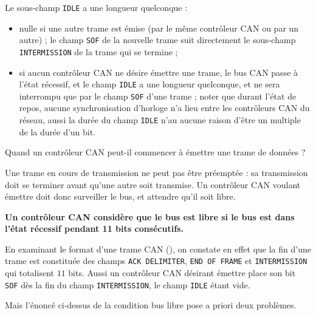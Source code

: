 Le sous-champ \texttt{IDLE} a une longueur quelconque :
\begin{itemize}
  \item nulle si une autre trame est émise (par le même contrôleur CAN ou par un autre) ; le champ \texttt{SOF} de la nouvelle trame suit directement le sous-champ \texttt{INTERMISSION} de la trame qui se termine ;
  \item si aucun contrôleur CAN ne désire émettre une trame, le bus CAN passe à l'état récessif, et le champ \texttt{IDLE} a une longueur quelconque, et ne sera interrompu que par le champ \texttt{SOF} d'une trame ; noter que durant l'état de repos, aucune synchronisation d'horloge n'a lieu entre les contrôleurs CAN du réseau, aussi la durée du champ \texttt{IDLE} n'au aucune raison d'être un multiple de la durée d'un bit.
\end{itemize}





Quand un contrôleur CAN peut-il commencer à émettre une trame de données ?

Une trame en cours de transmission ne peut pas être préemptée : sa transmission doit se terminer avant qu'une autre soit transmise. Un contrôleur CAN voulant émettre doit donc surveiller le bus, et attendre qu'il soit libre.

{\bf Un contrôleur CAN considère que le bus est libre si le bus est dans l’état récessif pendant 11 bits consécutifs.}

En examinant le format d'une trame CAN (), on constate en effet que la fin d'une trame est constituée des champs \texttt{ACK DELIMITER}, \texttt{END OF FRAME} et \texttt{INTERMISSION} qui totalisent $11$ bits. Aussi un contrôleur CAN désirant émettre place son bit \texttt{SOF} dès la fin du champ \texttt{INTERMISSION}, le champ \texttt{IDLE} étant vide.

%

Mais l'énoncé ci-dessus de la condition bus libre pose a priori deux problèmes.

